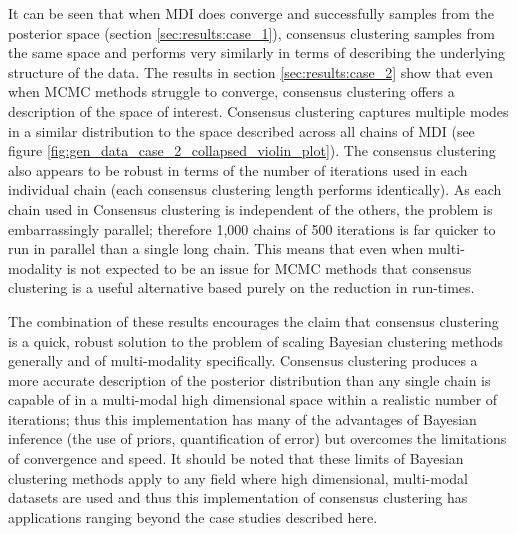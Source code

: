 \documentclass[12pt]{article} %
\begin{document}
	It can be seen that when MDI does converge and successfully samples from the posterior space (section \ref{sec:results:case_1}), consensus clustering samples from the same space and performs very similarly in terms of describing the underlying structure of the data. The results in section \ref{sec:results:case_2} show that even when MCMC methods struggle to converge, consensus clustering offers a description of the space of interest. Consensus clustering captures multiple modes in a similar distribution to the space described across all chains of MDI (see figure \ref{fig:gen_data_case_2_collapsed_violin_plot}). The consensus clustering also appears to be robust in terms of the number of iterations used in each individual chain (each consensus clustering length performs identically). As each chain used in Consensus clustering is independent of the others, the problem is embarrassingly parallel; therefore 1,000 chains of 500 iterations is far quicker to run in parallel than a single long chain. This means that even when multi-modality is not expected to be an issue for MCMC methods that consensus clustering is a useful alternative based purely on the reduction in run-times.
	
	The combination of these results encourages the claim that consensus clustering is a quick, robust solution to the problem of scaling Bayesian clustering methods generally and of multi-modality specifically. Consensus clustering produces a more accurate description of the posterior distribution than any single chain is capable of in a multi-modal high dimensional space within a realistic number of iterations; thus this implementation has many of the advantages of Bayesian inference (the use of priors, quantification of error) but overcomes the limitations of convergence and speed. It should be noted that these limits of Bayesian clustering methods apply to any field where high dimensional, multi-modal datasets are used and thus this implementation of consensus clustering has applications ranging beyond the case studies described here.
	
\end{document}
